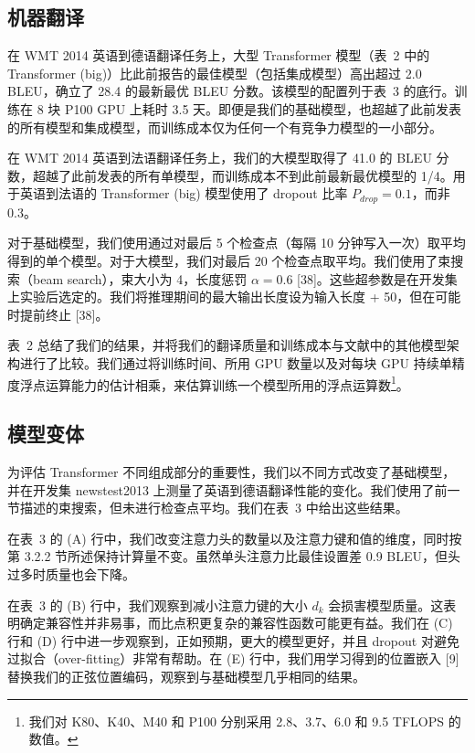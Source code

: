 \documentclass[11pt,UTF8,fontset=fandol]{ctexart}
\begin{document}
\subsection{机器翻译}

在 WMT 2014 英语到德语翻译任务上，大型 Transformer 模型（表~2 中的 Transformer (big)）比此前报告的最佳模型（包括集成模型）高出超过 2.0 BLEU，确立了 28.4 的最新最优 BLEU 分数。该模型的配置列于表~3 的底行。训练在 8 块 P100 GPU 上耗时 3.5 天。即便是我们的基础模型，也超越了此前发表的所有模型和集成模型，而训练成本仅为任何一个有竞争力模型的一小部分。

在 WMT 2014 英语到法语翻译任务上，我们的大模型取得了 41.0 的 BLEU 分数，超越了此前发表的所有单模型，而训练成本不到此前最新最优模型的 1/4。用于英语到法语的 Transformer (big) 模型使用了 dropout 比率 $P_{drop} = 0.1$，而非 0.3。

对于基础模型，我们使用通过对最后 5 个检查点（每隔 10 分钟写入一次）取平均得到的单个模型。对于大模型，我们对最后 20 个检查点取平均。我们使用了束搜索（beam search），束大小为 4，长度惩罚 $\alpha = 0.6$ [38]。这些超参数是在开发集上实验后选定的。我们将推理期间的最大输出长度设为输入长度 + 50，但在可能时提前终止 [38]。

表~2 总结了我们的结果，并将我们的翻译质量和训练成本与文献中的其他模型架构进行了比较。我们通过将训练时间、所用 GPU 数量以及对每块 GPU 持续单精度浮点运算能力的估计相乘，来估算训练一个模型所用的浮点运算数\footnote{我们对 K80、K40、M40 和 P100 分别采用 2.8、3.7、6.0 和 9.5 TFLOPS 的数值。}。

\subsection{模型变体}

为评估 Transformer 不同组成部分的重要性，我们以不同方式改变了基础模型，并在开发集 newstest2013 上测量了英语到德语翻译性能的变化。我们使用了前一节描述的束搜索，但未进行检查点平均。我们在表~3 中给出这些结果。

在表~3 的 (A) 行中，我们改变注意力头的数量以及注意力键和值的维度，同时按第 3.2.2 节所述保持计算量不变。虽然单头注意力比最佳设置差 0.9 BLEU，但头过多时质量也会下降。

在表~3 的 (B) 行中，我们观察到减小注意力键的大小 $d_k$ 会损害模型质量。这表明确定兼容性并非易事，而比点积更复杂的兼容性函数可能更有益。我们在 (C) 行和 (D) 行中进一步观察到，正如预期，更大的模型更好，并且 dropout 对避免过拟合（over-fitting）非常有帮助。在 (E) 行中，我们用学习得到的位置嵌入 [9] 替换我们的正弦位置编码，观察到与基础模型几乎相同的结果。
\end{document}
